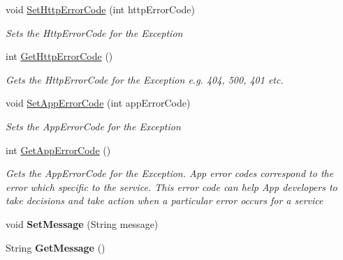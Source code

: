 \begin{DoxyCompactItemize}
\item 
void \hyperlink{classcom_1_1shephertz_1_1app42_1_1paas_1_1sdk_1_1windows_1_1_app42_exception_a2a2eb127264f8674bc5667d69325a562}{Set\+Http\+Error\+Code} (int http\+Error\+Code)
\begin{DoxyCompactList}\small\item\em Sets the Http\+Error\+Code for the Exception \end{DoxyCompactList}\item 
int \hyperlink{classcom_1_1shephertz_1_1app42_1_1paas_1_1sdk_1_1windows_1_1_app42_exception_af24c7d320023c7f560073abb10656fa1}{Get\+Http\+Error\+Code} ()
\begin{DoxyCompactList}\small\item\em Gets the Http\+Error\+Code for the Exception e.\+g. 404, 500, 401 etc. \end{DoxyCompactList}\item 
void \hyperlink{classcom_1_1shephertz_1_1app42_1_1paas_1_1sdk_1_1windows_1_1_app42_exception_aefc88b47ba998b3baed870e01ba68a51}{Set\+App\+Error\+Code} (int app\+Error\+Code)
\begin{DoxyCompactList}\small\item\em Sets the App\+Error\+Code for the Exception \end{DoxyCompactList}\item 
int \hyperlink{classcom_1_1shephertz_1_1app42_1_1paas_1_1sdk_1_1windows_1_1_app42_exception_a61eea907a160c101f81ed4c434eccf49}{Get\+App\+Error\+Code} ()
\begin{DoxyCompactList}\small\item\em Gets the App\+Error\+Code for the Exception. App error codes correspond to the error which specific to the service. This error code can help App developers to take decisions and take action when a particular error occurs for a service \end{DoxyCompactList}\item 
\hypertarget{classcom_1_1shephertz_1_1app42_1_1paas_1_1sdk_1_1windows_1_1_app42_exception_a38ec37bad49de51aa0d975fb7c2b8c0e}{void {\bfseries Set\+Message} (String message)}\label{classcom_1_1shephertz_1_1app42_1_1paas_1_1sdk_1_1windows_1_1_app42_exception_a38ec37bad49de51aa0d975fb7c2b8c0e}

\item 
\hypertarget{classcom_1_1shephertz_1_1app42_1_1paas_1_1sdk_1_1windows_1_1_app42_exception_a588f34aff677d182a6c707159b8e6d88}{String {\bfseries Get\+Message} ()}\label{classcom_1_1shephertz_1_1app42_1_1paas_1_1sdk_1_1windows_1_1_app42_exception_a588f34aff677d182a6c707159b8e6d88}

\end{DoxyCompactItemize}


